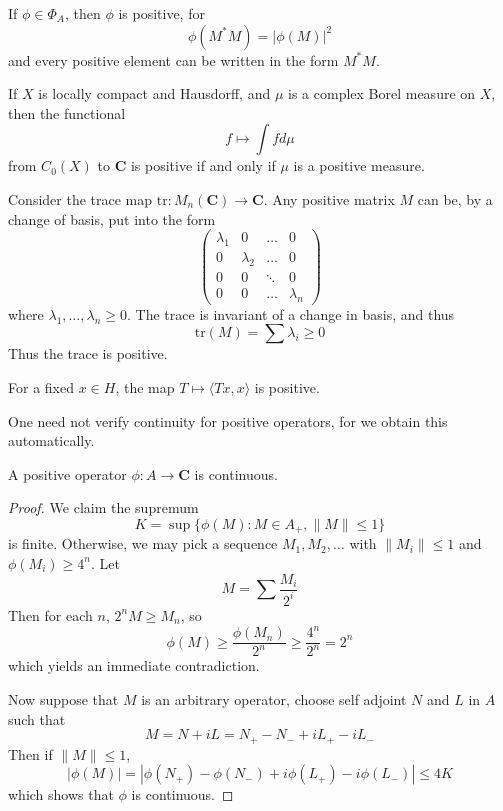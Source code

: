 \begin{example}
    If $\phi \in \Phi_A$, then $\phi$ is positive, for
    \[ \phi(M^*M) = |\phi(M)|^2 \]
    and every positive element can be written in the form $M^*M$.
\end{example}

\begin{example}
    If $X$ is locally compact and Hausdorff, and $\mu$ is a complex Borel measure on $X$, then the functional
    \[ f \mapsto \int f d\mu \]
    from $C_0(X)$ to $\mathbf{C}$ is positive if and only if $\mu$ is a positive measure.
\end{example}

\begin{example}
    Consider the trace map $\text{tr}: M_n(\mathbf{C}) \to \mathbf{C}$. Any positive matrix $M$ can be, by a change of basis, put into the form
    \[ \begin{pmatrix} \lambda_1 & 0 & \dots & 0 \\ 0 & \lambda_2 & \dots & 0 \\ 0 & 0 & \ddots & 0 \\ 0 & 0 & \dots & \lambda_n \end{pmatrix} \]
    where $\lambda_1, \dots, \lambda_n \geq 0$. The trace is invariant of a change in basis, and thus
    \[ \text{tr}(M) = \sum \lambda_i \geq 0 \]
    Thus the trace is positive.
\end{example}

\begin{example}
    For a fixed $x \in H$, the map $T \mapsto \langle Tx, x \rangle$ is positive.
\end{example}

One need not verify continuity for positive operators, for we obtain this automatically.

\begin{prop}
    A positive operator $\phi:A \to \mathbf{C}$ is continuous.
\end{prop}
\begin{proof}
    We claim the supremum
    \[ K = \sup \{ \phi(M): M \in A_+, \| M \| \leq 1 \} \]
    is finite. Otherwise, we may pick a sequence $M_1, M_2, \dots$ with $\| M_i \| \leq 1$ and $\phi(M_i) \geq 4^n$. Let
    \[ M = \sum \frac{M_i}{2^i} \]
    Then for each $n$, $2^n M \geq M_n$, so
    \[ \phi(M) \geq \frac{\phi(M_n)}{2^n} \geq \frac{4^n}{2^n} = 2^n \]
    which yields an immediate contradiction.

    Now suppose that $M$ is an arbitrary operator, choose self adjoint $N$ and $L$ in $A$ such that
    \[ M = N + iL = N_+ - N_- + iL_+ - iL_- \]
    Then if $\| M \| \leq 1$,
    \[ |\phi(M)| = |\phi(N_+) - \phi(N_-) + i\phi(L_+) - i\phi(L_-)| \leq 4K \]
    which shows that $\phi$ is continuous.
\end{proof}

